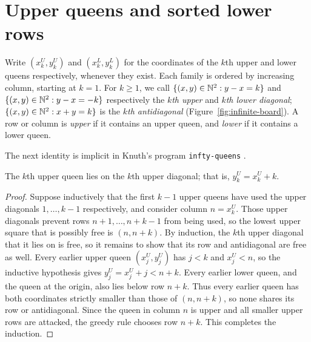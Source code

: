 \section{Upper queens and sorted lower rows}\label{sec:rows}
Write $(x_k^U,y_k^U)$ and $(x_k^L,y_k^L)$ for the coordinates of the $k$th
upper and lower queens respectively, whenever they exist. Each family is
ordered by increasing column, starting at $k=1$.
For $k\ge1$, we call $\{(x,y)\in\mathbb N^2:y-x=k\}$ and
$\{(x,y)\in\mathbb N^2:y-x=-k\}$ respectively the \emph{$k$th upper}
and \emph{$k$th lower diagonal}; $\{(x,y)\in\mathbb N^2:x+y=k\}$
is the \emph{$k$th antidiagonal} (Figure~\ref{fig:infinite-board}).
A row or column is \emph{upper} if it contains an upper queen, and \emph{lower} if it contains a lower queen.

The next identity is implicit in Knuth's program \texttt{infty-queens}
\cite{KnuthQueens}. 
\begin{lemma}\label{lem:upper}
The $k$th upper queen lies on the $k$th upper diagonal; that is,
$y_k^U=x_k^U+k$.
\end{lemma}
\noindent
\begin{minipage}[t]{0.60\linewidth}
\vspace{0pt}
\begin{proof}
Suppose inductively that the first $k-1$ upper queens have used
the upper diagonals $1,\dots,k-1$ respectively, and consider column $n=x_k^U$. Those upper diagonals prevent rows $n+1,\dots,n+k-1$ from being used,
so the lowest upper square that is possibly free is
$(n,n+k)$. By induction, the $k$th upper diagonal that it lies on is free,
so it remains
to show that its row and antidiagonal are free as well. 
Every earlier upper queen $(x_j^U,y_j^U)$ has $j<k$ and
$x_j^U<n$, so the inductive hypothesis gives
$y_j^U=x_j^U+j<n+k$. Every earlier lower queen, and the queen at the
origin, also lies below row $n+k$. Thus every earlier queen has both
coordinates strictly smaller than those of $(n,n+k)$, so none shares
its row or antidiagonal. Since the queen in column $n$ is upper and
all smaller upper rows are attacked, the greedy rule chooses row
$n+k$. This completes the induction.
\end{proof}
\end{minipage}\hfill
